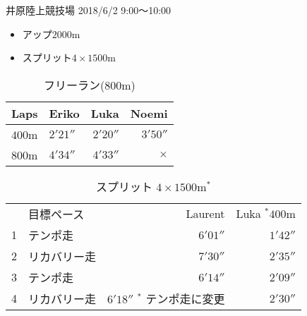 \documentclass[11pt]{article}
\begin{document}
井原陸上競技場 \small{2018/6/2 9:00～10:00}\\
\begin{itemize}
\item アップ$2000$m
\item スプリット$4\times 1500$m
\end{itemize}

\begin{table}[h!]
\begin{center}
\caption*{フリーラン($800$m)}
\begin{tabular}{llrr}
Laps & Eriko & Luka & Noemi \\
\hline \noalign{\smallskip}
$400$m & $2'21''$ & $2'20''$ & $3'50''$ \\
\cline{2-4}\noalign{\smallskip}
$800$m & $4'34''$ & $4'33''$ & \parbox[t]{1cm}{\centering $\times$} \\
\end{tabular}
\end{center}
\end{table}

\begin{table}[h!]
\begin{center}
\caption*{スプリット $4\times{}1500\text{m}^*$}
\begin{tabular}{llrr}
{} & 目標ペース & \parbox[t]{2cm}{\raggedleft Laurent \\ } & \parbox[t]{2cm}{\raggedleft Luka \\ \tiny{$^*400$m}} \\
\noalign{\smallskip} \hline \noalign{\smallskip}
1 & テンポ走    & $6'01''$ & $1'42''$ \\
\noalign{\smallskip}
2 & リカバリー走 & $7'30''$ & $2'35''$ \\
\noalign{\smallskip}
3 & テンポ走 & $6'14''$ & $2'09''$ \\
\noalign{\smallskip}
4 & リカバリー走 & \parbox[t]{2cm}{\raggedleft $6'18''$ \\ \tiny{$^*$ テンポ走に変更} }  & $2'30''$ \\
\end{tabular}
\end{center}
\end{table}
\end{document}
